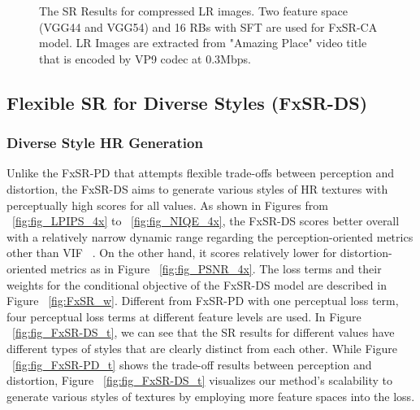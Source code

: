 \documentclass{article}
\begin{document}
\begin{figure*}[!t]
\centering
{}
\caption{The SR Results for compressed LR images. Two feature space (VGG44 and VGG54) and 16 RBs with SFT are used for FxSR-CA model. LR Images are extracted from "Amazing Place" video title that is encoded by VP9 codec at 0.3Mbps.}
\label{fig:FxSR-CA}
\end{figure*}

\subsection{Flexible SR for Diverse Styles (FxSR-DS)}
\subsubsection{Diverse Style HR Generation}
Unlike the FxSR-PD that attempts flexible trade-offs between perception and distortion, the FxSR-DS aims to generate various styles of HR textures with perceptually high scores for all  values. As shown in Figures from ~\ref{fig:fig_LPIPS_4x} to ~\ref{fig:fig_NIQE_4x}, the FxSR-DS scores better overall with a relatively narrow dynamic range regarding the perception-oriented metrics other than VIF ~\cite{sheikh2006image}. On the other hand, it scores relatively lower for distortion-oriented metrics as in Figure ~\ref{fig:fig_PSNR_4x}. The loss terms and their weights for the conditional objective of the FxSR-DS model are described in Figure ~\ref{fig:FxSR_w}. Different from FxSR-PD with one perceptual loss term, four perceptual loss terms at different feature levels are used. In Figure ~\ref{fig:fig_FxSR-DS_t}, we can see that the SR results for different  values have different types of styles that are clearly distinct from each other. While Figure ~\ref{fig:fig_FxSR-PD_t} shows the trade-off results between perception and distortion, Figure ~\ref{fig:fig_FxSR-DS_t} visualizes our method's scalability to generate various styles of textures by employing more feature spaces into the loss. 
\end{document}
